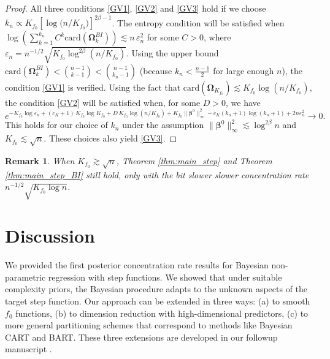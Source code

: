 \documentclass{article}
\newcommand{\1}{\mathbb{I}}
\newcommand{\e}{\varepsilon}
\newcommand{\bm}[1]{\boldsymbol{#1}}
\def\b{\bm{\beta}}
\def\b{\bm{\beta}}
\newtheorem{remark}{Remark}[section]
\theoremstyle{assumption}
\begin{document}
\begin{proof}
All three conditions \ref{GV1}, \ref{GV2} and  \ref{GV3} hold if we choose $k_n\propto K_{f_0}[{\log (n/K_{f_0}})]^{2\beta-1}$. %
The entropy condition will be satisfied when
$\log \left(\sum_{k=1}^{k_n} C^k\mathrm{card}(\bm{\Omega}_k^{BI})\right)\lesssim n\,\varepsilon_n^2$ for some $C>0$, {where $\e_n = n^{-1/2}\sqrt{K_{f_0}\log^{2\beta}(n/K_{f_0})}$}.  Using the upper bound $\mathrm{card}(\bm{\Omega}_k^{BI})<{n-1\choose k-1}<{n-1\choose k_n-1}$ (because $k_n<\frac{n-1}{2}$ for large enough $n$), the condition  \ref{GV1} is verified. Using the fact that $\mathrm{card}(\bm\Omega_{K_{f_0}})\lesssim K_{f_0}\log (n/K_{f_0})$, the condition \ref{GV2} will be satisfied when, for some $D>0$, we have
\begin{equation}
e^{-K_{f_0}\log{\e_n}+(c_K+1)\,K_{f_0}\log K_{f_0}+D\,K_{f_0}\log (n/{K_{f_0}})+ K_{f_0}\|\b^0\|_\infty^2 - c_K(k_n+1)\log(k_n+1) + 2n\e_n^2} \to 0. \label{C2eq}
\end{equation}
This holds for our choice of $k_n$ under the assumption $\|\b^0\|^2_\infty\lesssim \log^{2\beta} n$ and $K_{f_0}\lesssim \sqrt{n}$. These choices also yield \ref{GV3}. 
\end{proof}

\begin{remark}\label{remark}
When $K_{f_0}\gtrsim\sqrt n$, Theorem \ref{thm:main_step} and  Theorem \ref{thm:main_step_BI} still hold, only with the bit slower slower concentration rate $n^{-1/2}\sqrt{K_{f_0}\log n}$.
\end{remark}



\section{Discussion}
We provided the first posterior concentration rate results for Bayesian non-parametric regression with step functions. We showed that under suitable complexity priors,  the Bayesian procedure adapts to the unknown aspects of the  target step function. Our approach can be  extended in three ways: (a) to smooth $f_0$ functions, (b) to dimension reduction with {high-dimensional} predictors, (c) to more general partitioning schemes that correspond to  methods like Bayesian CART and BART.  These three extensions are developed in our  followup manuscript {\cite{Rockova2017}}. 
\end{document}
